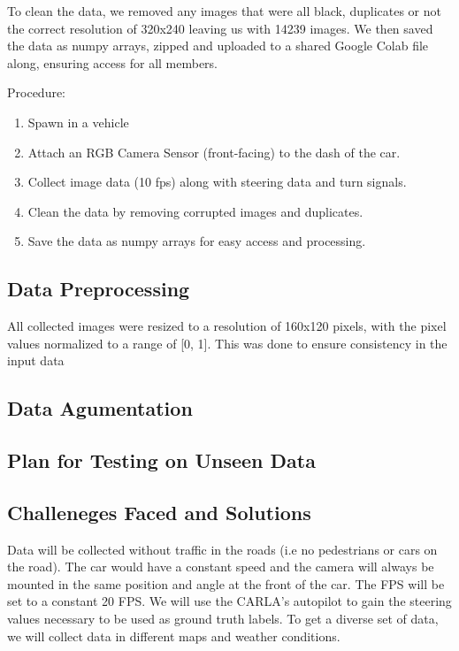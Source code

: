 \documentclass{article} %
\begin{document}
To clean the data, we removed any images that were all black, duplicates or not the correct resolution of 320x240 leaving us with 14239 images.  We then saved 
the data as numpy arrays, zipped and uploaded to a shared Google Colab file along, ensuring access for all members. 

Procedure:
\begin{enumerate}
  \item{Spawn in a vehicle}
  \item{Attach an RGB Camera Sensor (front-facing) to the dash of the car.}
  \item{Collect image data (10 fps) along with steering data and turn signals.}
  \item {Clean the data by removing corrupted images and duplicates.}
  \item {Save the data as numpy arrays for easy access and processing.}
\end{enumerate}


\subsection{Data Preprocessing}
All collected images were resized to a resolution of 160x120 pixels, with the pixel values normalized to a range of [0, 1]. 
This was done to ensure consistency in the input data  

\subsection{Data Agumentation}

\subsection{Plan for Testing on Unseen Data}

\subsection{Challeneges Faced and Solutions}


Data will  be collected without traffic in the roads (i.e
no pedestrians or cars on the road). The car would have a constant speed
and the camera will always be mounted in the same position and angle at
the front of the car. The FPS will be set to a constant 20 FPS.
We will use the CARLA's autopilot to gain the steering values necessary to be used as ground truth labels. To get a diverse
set of data, we will collect data in different maps and weather conditions.
\end{document}
